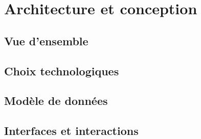 \section{Architecture et conception}
\label{sec:architecture}

\subsection{Vue d'ensemble}


\subsection{Choix technologiques}

\subsection{Modèle de données}

\subsection{Interfaces et interactions}
